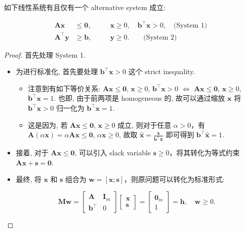 \begin{exampleblock}{}
如下线性系统有且仅有一个 alternative system 成立:

\[
\begin{aligned}
  \bm{A}\bm{x} &\leq \bm{0},\quad &&\bm{x} \geq 0,\quad \bm{b}^\top \bm{x} > 0, \quad \text{(System 1)}\\
  \bm{A}^\top \bm{y} &\geq \bm{b},\quad &&\bm{y} \geq 0. \quad \quad \text{(System 2)}
\end{aligned}
\]


\begin{proof}{}
首先处理 System 1.

\begin{itemize}
\item {}为进行标准化, 首先要处理 $\bm{b}^\top \bm{x} > 0$ 这个 strict inequality.

\begin{itemize}
\item {}注意到有如下等价关系: $\bm{A}\bm{x} \leq \bm{0}$, $\bm{x} \geq 0$, $\bm{b}^\top \bm{x} > 0$ $\iff$ $\bm{A}\bm{x} \leq \bm{0}$, $\bm{x} \geq 0$, $\bm{b}^\top \bm{x} = 1$. 也即, 由于前两项是 homogeneous 的, 故可以通过缩放 $\bm{x}$ 将 $\bm{b}^\top \bm{x} > 0$ 归一化为 $\bm{b}^\top \bm{x} = 1$.


\item {}这是因为, 若 $\bm{A}\bm{x} \leq \bm{0}$, $\bm{x} \geq 0$ 成立, 则对于任意 $\alpha > 0$，有 $\bm{A}(\alpha \bm{x}) = \alpha \bm{A}\bm{x} \leq \bm{0}$, $\alpha \bm{x} \geq 0$, 故取 $\bm{\hat{x}} = \frac{\bm{x}}{\bm{b}^\top \bm{x}}$ 即可得到 $\bm{b}^\top \bm{\hat{x}} = 1$.


\end{itemize}


\item {}接着, 对于 $\bm{A}\bm{x} \leq \bm{0}$, 可以引入 slack variable $\bm{s} \geq 0$，将其转化为等式约束 $\bm{A}\bm{x} + \bm{s} = \bm{0}$.


\item {}最终, 将 $\bm{x}$ 和 $\bm{s}$ 组合为 $\bm{w} = [\bm{x}; \bm{s}]$，则原问题可以转化为标准形式:

\[
\bm{M}\bm{w} = \begin{bmatrix} \bm{A} & \bm{I}_m \\ \bm{b}^\top & 0 \end{bmatrix} \begin{bmatrix} \bm{x} \\ \bm{s} \end{bmatrix} = \begin{bmatrix} \bm{0}_m \\ 1 \end{bmatrix} = \bm{h},\quad \bm{w} \geq 0.
\]



\end{itemize}
\end{proof}
\end{exampleblock}

